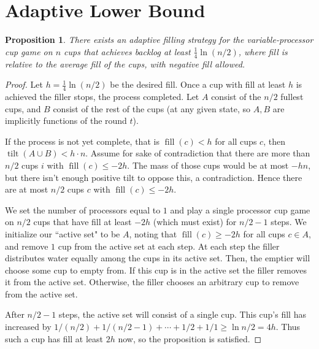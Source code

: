 \documentclass[twocolumn]{article}[11pt]
\DeclareMathOperator{\tilt}{\text{tilt}}
\DeclareMathOperator{\fil}{\text{fill}}
\newtheorem{proposition}{Proposition}
\begin{document}
\section{Adaptive Lower Bound}\label{sec:adaptive}
\begin{proposition}
\label{prop:adaptiveBase}
  There exists an adaptive filling strategy for the variable-processor cup game
  on $n$ cups that achieves backlog at least $\frac{1}{4}\ln (n/2)$, where fill
  is relative to the average fill of the cups, with negative fill allowed.
\end{proposition}
\begin{proof}
  Let $h = \frac{1}{4}\ln (n/2)$ be the desired fill. Once a cup with fill at
  least $h$ is achieved the filler stops, the process completed.  
  Let $A$ consist of the $n/2$ fullest cups, and $B$ consist of the rest of the
  cups (at any given state, so $A, B$ are implicitly functions of the round
  $t$).

  If the process is not yet complete, that is $\fil(c) < h$ for all cups $c$,
  then $\tilt(A\cup B) < h\cdot n$. Assume for
  sake of contradiction that there are more than $n/2$ cups $i$ with $\fil(c)
  \le -2h$. The mass of those cups would be at most $-hn$, but there isn't
  enough positive tilt to oppose this, a contradiction. Hence there are at most
  $n/2$ cups $c$ with $\fil(c) \le -2h$. 

  We set the number of processors equal to $1$ and play a single processor cup
  game on $n/2$ cups that have fill at least $-2h$ (which must exist) for $n/2
  -1$ steps. We initialize our ``active set" to be $A$, noting that $\fil(c)
  \ge -2h$ for all cups $c\in A$, and remove $1$ cup from the active set at
  each step.
  At each step the filler distributes water equally among the cups in its
  active set. Then, the emptier will choose some cup to empty from. If this cup
  is in the active set the filler removes it from the active set. Otherwise, the
  filler chooses an arbitrary cup to remove from the active set.

  After $n/2-1$ steps, the active set will consist of a single cup. This cup's
  fill has increased by $1/(n/2) + 1/(n/2 - 1) + \cdots + 1/2 + 1/1
  \ge \ln n/2 = 4h$. Thus such a cup has fill at least $2h$ now, so the
  proposition is satisfied.
\end{proof}
\end{document}
